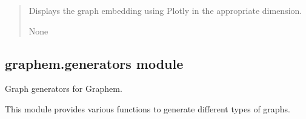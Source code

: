 \documentclass[letterpaper,10pt,english]{sphinxmanual}
\begin{document}
\begin{fulllineitems}
\begin{fulllineitems}
\begin{quote}
\begin{description}
\begin{itemize}
\end{itemize}

\sphinxAtStartPar
Displays the graph embedding using Plotly in the appropriate dimension.

\sphinxAtStartPar
None

\end{description}\end{quote}

\end{fulllineitems}


\end{fulllineitems}



\subsection{graphem.generators module}
\label{\detokenize{graphem:module-graphem.generators}}\label{\detokenize{graphem:graphem-generators-module}}
\sphinxAtStartPar
Graph generators for Graphem.

\sphinxAtStartPar
This module provides various functions to generate different types of graphs.
\end{document}
